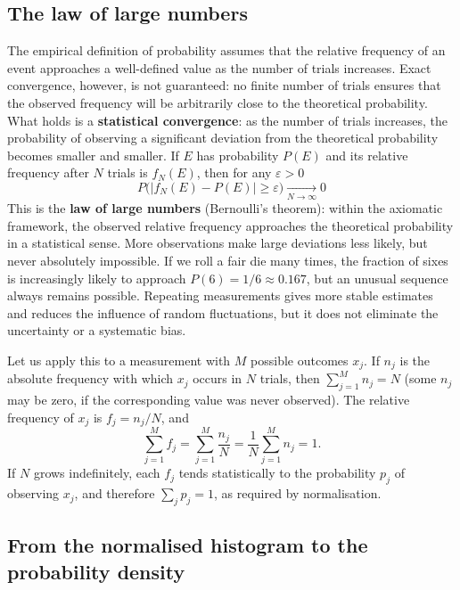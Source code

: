 \documentclass[letterpaper,11pt,leqno]{book}
\begin{document}
\subsection{The law of large numbers}

The empirical definition of probability assumes that the relative frequency of an event approaches a well-defined value as the number of trials increases. Exact convergence, however, is not guaranteed: no finite number of trials ensures that the observed frequency will be arbitrarily close to the theoretical probability. What holds is a \textbf{statistical convergence}: as the number of trials increases, the probability of observing a significant deviation from the theoretical probability becomes smaller and smaller. If $E$ has probability $P(E)$ and its relative frequency after $N$ trials is $f_N(E)$, then for any $\varepsilon > 0$
\begin{equation}
\boxed{P\big(|f_N(E) - P(E)| \ge \varepsilon\big) \xrightarrow[N \to \infty]{} 0}
\label{eq:lln_frequency}
\end{equation}
This is the \textbf{law of large numbers} (Bernoulli's theorem): within the axiomatic framework, the observed relative frequency approaches the theoretical probability in a statistical sense. More observations make large deviations less likely, but never absolutely impossible. If we roll a fair die many times, the fraction of sixes is increasingly likely to approach $P(6) = 1/6 \approx 0.167$, but an unusual sequence always remains possible. Repeating measurements gives more stable estimates and reduces the influence of random fluctuations, but it does not eliminate the uncertainty or a systematic bias.

Let us apply this to a measurement with $M$ possible outcomes $x_j$. If $n_j$ is the absolute frequency with which $x_j$ occurs in $N$ trials, then $\sum_{j=1}^{M}n_j = N$ (some $n_j$ may be zero, if the corresponding value was never observed). The relative frequency of $x_j$ is $f_j = n_j/N$, and
\begin{equation}
\sum_{j=1}^{M}f_j = \sum_{j=1}^{M}\frac{n_j}{N} = \frac{1}{N}\sum_{j=1}^{M}n_j = 1.
\label{eq:frequencies_normalised}
\end{equation}
If $N$ grows indefinitely, each $f_j$ tends statistically to the probability $p_j$ of observing $x_j$, and therefore $\sum_j p_j = 1$, as required by normalisation.

\subsection{From the normalised histogram to the probability density}
\label{sec:pdf}
\end{document}
